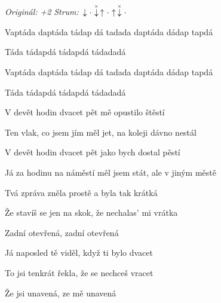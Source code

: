 \begin{song}


\begin{headerbox}
\RaiseBoxWithAccents
{} \quad
\textit{Originál: +2} \quad
\textit{Strum:} $\Down\Miss\ChuckDown\Up\Miss\Up\ChuckDown\Miss$ 
\end{headerbox}

\begin{hchordbox}
\end{hchordbox}

\Large

\bigskip

\begin{chorusbox}{\Refren}
Vaptáda daptáda tádap dá tadada daptáda dádap tapdá \par
Táda tádapdá tádapdá tádadadá  \par
{}Vaptáda daptáda tádap dá tadada daptáda dádap tapdá \par
Táda tádapdá tádapdá tádadadá  \par
\end{chorusbox}

\bigskip

V devět hodin dvacet pět  mě opustilo štěstí \par
Ten vlak, co jsem jím měl jet, na koleji  dávno nestál \par
{}V devět hodin dvacet pět  jako bych dostal pěstí \par
Já za hodinu na náměstí měl jsem stát, ale v jiným městě

\bigskip

Tvá zpráva zněla prostě a byla tak krátká \par
Že stavíš se jen na skok, že nechalas' mi vrátka \par
{}Zadní otevřená, zadní otevřená

\bigskip

Já naposled tě viděl, když ti bylo dvacet \par
{}To jsi tenkrát řekla, že se nechceš vracet \par
{}Že jsi unavená, ze mě unavená \par


\end{song}
